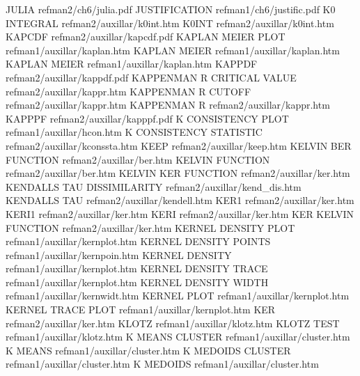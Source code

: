 JULIA                                   refman2/ch6/julia.pdf
JUSTIFICATION                           refman1/ch6/justific.pdf
K0 INTEGRAL                             refman2/auxillar/k0int.htm
K0INT                                   refman2/auxillar/k0int.htm
KAPCDF                                  refman2/auxillar/kapcdf.pdf
KAPLAN MEIER PLOT                       refman1/auxillar/kaplan.htm
KAPLAN MEIER                            refman1/auxillar/kaplan.htm
KAPLAN MEIER                            refman1/auxillar/kaplan.htm
KAPPDF                                  refman2/auxillar/kappdf.pdf
KAPPENMAN R CRITICAL VALUE              refman2/auxillar/kappr.htm
KAPPENMAN R CUTOFF                      refman2/auxillar/kappr.htm
KAPPENMAN R                             refman2/auxillar/kappr.htm
KAPPPF                                  refman2/auxillar/kapppf.pdf
K CONSISTENCY PLOT                      refman1/auxillar/hcon.htm
K CONSISTENCY STATISTIC                 refman2/auxillar/kconssta.htm
KEEP                                    refman2/auxillar/keep.htm
KELVIN BER FUNCTION                     refman2/auxillar/ber.htm
KELVIN FUNCTION                         refman2/auxillar/ber.htm
KELVIN KER FUNCTION                     refman2/auxillar/ker.htm
KENDALLS TAU DISSIMILARITY              refman2/auxillar/kend_dis.htm
KENDALLS TAU                            refman2/auxillar/kendell.htm
KER1                                    refman2/auxillar/ker.htm
KERI1                                   refman2/auxillar/ker.htm
KERI                                    refman2/auxillar/ker.htm
KER KELVIN FUNCTION                     refman2/auxillar/ker.htm
KERNEL DENSITY PLOT                     refman1/auxillar/kernplot.htm
KERNEL DENSITY POINTS                   refman1/auxillar/kernpoin.htm
KERNEL DENSITY                          refman1/auxillar/kernplot.htm
KERNEL DENSITY TRACE                    refman1/auxillar/kernplot.htm
KERNEL DENSITY WIDTH                    refman1/auxillar/kernwidt.htm
KERNEL PLOT                             refman1/auxillar/kernplot.htm
KERNEL TRACE PLOT                       refman1/auxillar/kernplot.htm
KER                                     refman2/auxillar/ker.htm
KLOTZ                                   refman1/auxillar/klotz.htm
KLOTZ TEST                              refman1/auxillar/klotz.htm
K MEANS CLUSTER                         refman1/auxillar/cluster.htm
K MEANS                                 refman1/auxillar/cluster.htm
K MEDOIDS CLUSTER                       refman1/auxillar/cluster.htm
K MEDOIDS                               refman1/auxillar/cluster.htm

